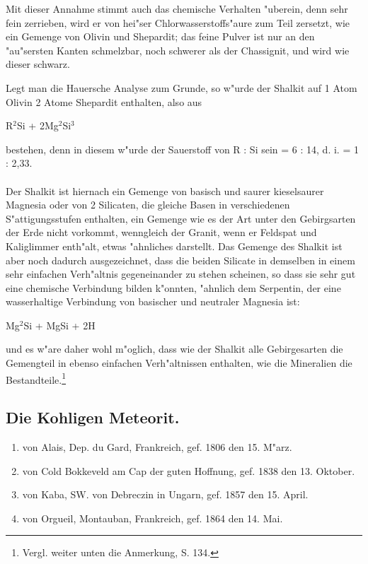 \documentclass[a4paper, 11pt, oneside, german]{article}
\begin{document}
Mit dieser Annahme stimmt auch das chemische Verhalten "uberein, denn sehr fein zerrieben, wird er von hei"ser Chlorwasserstoffs"aure zum Teil zersetzt, wie ein Gemenge von Olivin und Shepardit; das feine Pulver ist nur an den "au"sersten Kanten schmelzbar, noch schwerer als der Chassignit, und wird wie dieser schwarz.

Legt man die Hauersche Analyse zum Grunde, so w"urde der Shalkit auf 1 Atom Olivin 2 Atome Shepardit enthalten, also aus
\begin{center}
R$^{2}$Si + 2Mg$^{2}$Si$^{3}$
\end{center}
bestehen, denn in diesem w"urde der Sauerstoff von R : Si sein = 6 : 14, d. i. = 1 : 2,33.
\paragraph{}
Der Shalkit ist hiernach ein Gemenge von basisch und saurer kieselsaurer Magnesia oder von 2 Silicaten, die gleiche Basen in verschiedenen S"attigungsstufen enthalten, ein Gemenge wie es der Art unter den Gebirgsarten der Erde nicht vorkommt, wenngleich der Granit, wenn er Feldspat und Kaliglimmer enth"alt, etwas "ahnliches darstellt. Das Gemenge des Shalkit ist aber noch dadurch ausgezeichnet, dass die beiden Silicate in demselben in einem sehr einfachen Verh"altnis gegeneinander zu stehen scheinen, so dass sie sehr gut eine chemische Verbindung bilden k"onnten, "ahnlich dem Serpentin, der eine wasserhaltige Verbindung von basischer und neutraler Magnesia ist:
\begin{center}
Mg$^{2}$Si + MgSi + 2H
\end{center}
und es w"are daher wohl m"oglich, dass wie der Shalkit alle Gebirgesarten die Gemengteil in ebenso einfachen Verh"altnissen enthalten, wie die Mineralien die Bestandteile.\footnote{Vergl. weiter unten die Anmerkung, S. 134.}
\subsection{Die Kohligen Meteorit.}
\begin{enumerate}
    \item von Alais, Dep. du Gard, Frankreich, gef. 1806 den 15. M"arz.
    \item von Cold Bokkeveld am Cap der guten Hoffnung, gef. 1838 den 13. Oktober.
    \item von Kaba, SW. von Debreczin in Ungarn, gef. 1857 den 15. April.
    \item von Orgueil, Montauban, Frankreich, gef. 1864 den 14. Mai.
\end{enumerate}
\end{document}
